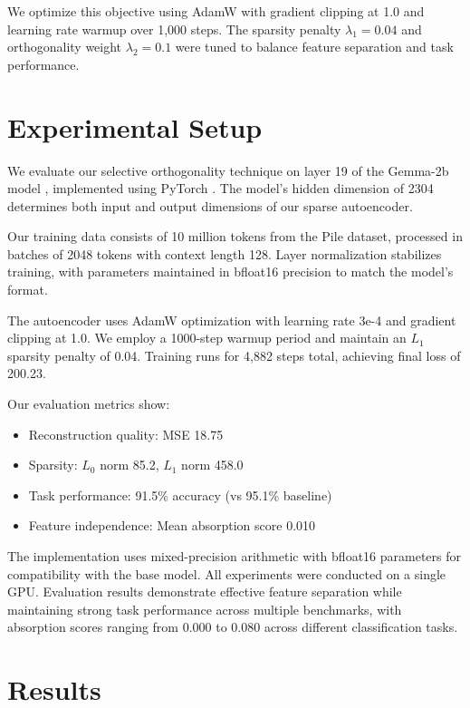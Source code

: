 \documentclass{article} %
\begin{document}
We optimize this objective using AdamW with gradient clipping at 1.0 and learning rate warmup over 1,000 steps. The sparsity penalty $\lambda_1=0.04$ and orthogonality weight $\lambda_2=0.1$ were tuned to balance feature separation and task performance.

\section{Experimental Setup}
\label{sec:experimental}

We evaluate our selective orthogonality technique on layer 19 of the Gemma-2b model \cite{vaswani2017attention}, implemented using PyTorch \cite{paszke2019pytorch}. The model's hidden dimension of 2304 determines both input and output dimensions of our sparse autoencoder.

Our training data consists of 10 million tokens from the Pile dataset, processed in batches of 2048 tokens with context length 128. Layer normalization \cite{ba2016layer} stabilizes training, with parameters maintained in bfloat16 precision to match the model's format.

The autoencoder uses AdamW optimization \cite{loshchilov2017adamw} with learning rate 3e-4 and gradient clipping at 1.0. We employ a 1000-step warmup period and maintain an $L_1$ sparsity penalty of 0.04. Training runs for 4,882 steps total, achieving final loss of 200.23.

Our evaluation metrics show:
\begin{itemize}
    \item Reconstruction quality: MSE 18.75
    \item Sparsity: $L_0$ norm 85.2, $L_1$ norm 458.0  
    \item Task performance: 91.5\% accuracy (vs 95.1\% baseline)
    \item Feature independence: Mean absorption score 0.010
\end{itemize}

The implementation uses mixed-precision arithmetic with bfloat16 parameters for compatibility with the base model. All experiments were conducted on a single GPU. Evaluation results demonstrate effective feature separation while maintaining strong task performance across multiple benchmarks, with absorption scores ranging from 0.000 to 0.080 across different classification tasks.

\section{Results}
\label{sec:results}
\end{document}
